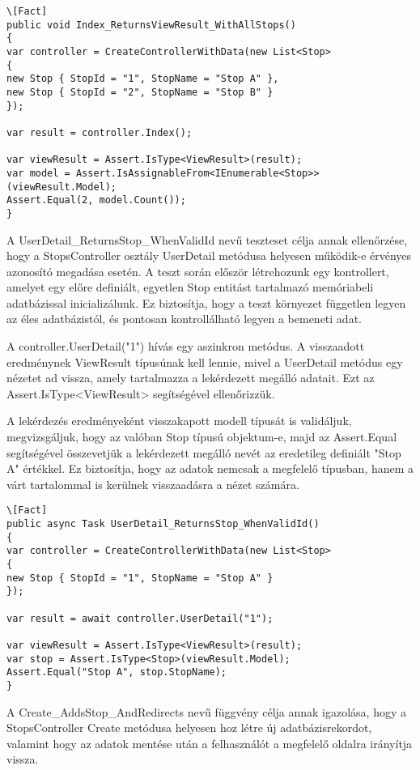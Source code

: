 \begin{lstlisting}
\[Fact]
public void Index_ReturnsViewResult_WithAllStops()
{
var controller = CreateControllerWithData(new List<Stop>
{
new Stop { StopId = "1", StopName = "Stop A" },
new Stop { StopId = "2", StopName = "Stop B" }
});

var result = controller.Index();

var viewResult = Assert.IsType<ViewResult>(result);
var model = Assert.IsAssignableFrom<IEnumerable<Stop>>(viewResult.Model);
Assert.Equal(2, model.Count());
}
\end{lstlisting}

A UserDetail\_ReturnsStop\_WhenValidId nevű teszteset célja annak ellenőrzése, hogy a StopsController osztály UserDetail metódusa helyesen működik-e érvényes azonosító megadása esetén. A teszt során először létrehozunk egy kontrollert, amelyet egy előre definiált, egyetlen Stop entitást tartalmazó memóriabeli adatbázissal inicializálunk. Ez biztosítja, hogy a teszt környezet független legyen az éles adatbázistól, és pontosan kontrollálható legyen a bemeneti adat.

A controller.UserDetail("1") hívás egy aszinkron metódus. A visszaadott eredménynek ViewResult típusúnak kell lennie, mivel a UserDetail metódus egy nézetet ad vissza, amely tartalmazza a lekérdezett megálló adatait. Ezt az Assert.IsType<ViewResult> segítségével ellenőrizzük.

A lekérdezés eredményeként visszakapott modell típusát is validáljuk, megvizsgáljuk, hogy az valóban Stop típusú objektum-e, majd az Assert.Equal segítségével összevetjük a lekérdezett megálló nevét az eredetileg definiált "Stop A" értékkel. Ez biztosítja, hogy az adatok nemcsak a megfelelő típusban, hanem a várt tartalommal is kerülnek visszaadásra a nézet számára.

\begin{lstlisting}
\[Fact]
public async Task UserDetail_ReturnsStop_WhenValidId()
{
var controller = CreateControllerWithData(new List<Stop>
{
new Stop { StopId = "1", StopName = "Stop A" }
});

var result = await controller.UserDetail("1");

var viewResult = Assert.IsType<ViewResult>(result);
var stop = Assert.IsType<Stop>(viewResult.Model);
Assert.Equal("Stop A", stop.StopName);
}
\end{lstlisting}

A Create\_AddsStop\_AndRedirects nevű függvény célja annak igazolása, hogy a StopsController Create metódusa helyesen hoz létre új adatbázisrekordot, valamint hogy az adatok mentése után a felhasználót a megfelelő oldalra irányítja vissza.

